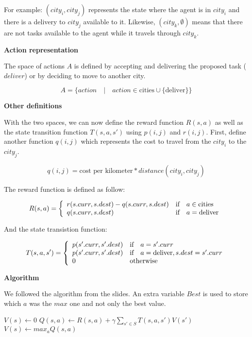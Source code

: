 \documentclass[11pt,a4paper]{article}
\begin{document}
For example: $(city_i, city_j)$ represents the state where the agent is
in $city_i$ and there is a delivery to $city_j$ available to it. Likewise,
$(city_k, \emptyset)$ means that there are not tasks available to the agent
while it travels through $city_k$.

\medskip
\textbf{Action representation}

The space of actions $A$ is defined by accepting and delivering the proposed
task ($deliver$) or by deciding to move to another city.

$$ A = \{ action \quad | \quad action \in \text{cities} \cup \{\text{deliver}\} \} $$

\medskip
\textbf{Other definitions}

With the two spaces, we can now define the reward function $R(s,a)$ as well as
the state transition function $T(s,a,s')$ using $p(i,j)$ and $r(i,j)$. First,
define another function $q(i,j)$ which represents the cost to travel from
the $city_i$ to the $city_j$.

$$ q(i, j) = \text{cost per kilometer} * distance(city_i, city_j) $$

The reward function is defined as follow:

$$ R(s, a) = \left\{
    \begin{array}{l l}
        r(s.curr, s.dest) - q(s.curr, s.dest) & \text{if} \quad a \in \text{cities} \\
        q(s.curr, s.dest) & \text{if} \quad a = \text{deliver}
    \end{array} \right. $$

And the state transistion function:


$$ T(s, a, s') = \left\{
    \begin{array}{l l}
        p(s'.curr, s'.dest) & \text{if} \quad a = s'.curr \\
        p(s'.curr, s'.dest) & \text{if} \quad a = \text{deliver}, s.dest = s'.curr \\
        0 & \text{otherwise}
    \end{array} \right. $$

\medskip
\textbf{Algorithm}

We followed the algorithm from the slides. An extra variable $ Best$ is used to
store which $a$ was the $max$ one and not only the best value.

\begin{algorithmic}
            \State $V(s) \gets 0$
        \EndFor
                    $Q(s, a) \gets R(s, a) + \gamma \sum_{s' \in S} T(s,a,s') V(s')$
                \EndFor
            $V(s) \gets max_aQ(s, a)$
            \EndFor
        \EndWhile
    \EndFunction
\end{algorithmic}
\end{document}
